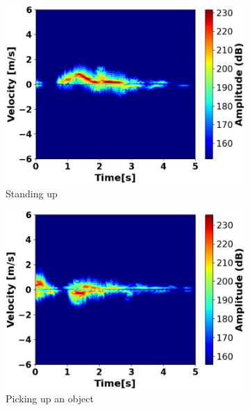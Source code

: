 \documentclass{l4proj}
\begin{document}
\begin{figure}[h]
\begin{subfigure}[b]{0.32\textwidth}
        \includegraphics[width=\textwidth]{images/Velocity-Time_3.png}
        \caption{Standing up}
        \label{fig:velocity-time3}
    \end{subfigure}
    \hfill
    \begin{subfigure}[b]{0.32\textwidth}
        \includegraphics[width=\textwidth]{images/Velocity-Time_4.png}
        \caption{Picking up an object}
        \label{fig:velocity-time4}
    \end{subfigure}
    \hfill
    \begin{subfigure}[b]{0.32\textwidth}

\end{subfigure}
\end{figure}
\end{document}
